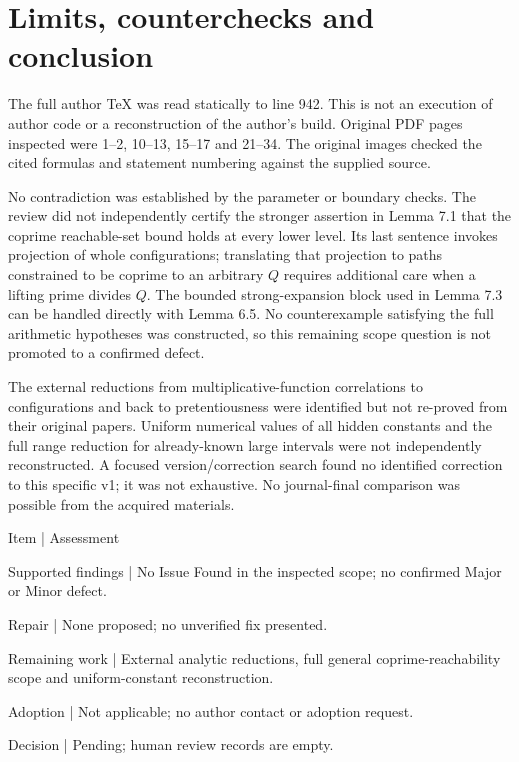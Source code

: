 \documentclass[10pt]{article}
\begin{document}
\section*{Limits, counterchecks and conclusion}
The full author TeX was read statically to line 942. This is not an execution of author code or a reconstruction of the author’s build. Original PDF pages inspected were 1–2, 10–13, 15–17 and 21–34. The original images checked the cited formulas and statement numbering against the supplied source.\par
No contradiction was established by the parameter or boundary checks. The review did not independently certify the stronger assertion in Lemma 7.1 that the coprime reachable-set bound holds at every lower level. Its last sentence invokes projection of whole configurations; translating that projection to paths constrained to be coprime to an arbitrary \(Q\) requires additional care when a lifting prime divides \(Q\). The bounded strong-expansion block used in Lemma 7.3 can be handled directly with Lemma 6.5. No counterexample satisfying the full arithmetic hypotheses was constructed, so this remaining scope question is not promoted to a confirmed defect.\par
The external reductions from multiplicative-function correlations to configurations and back to pretentiousness were identified but not re-proved from their original papers. Uniform numerical values of all hidden constants and the full range reduction for already-known large intervals were not independently reconstructed. A focused version/correction search found no identified correction to this specific v1; it was not exhaustive. No journal-final comparison was possible from the acquired materials.\par
Item | Assessment\par
Supported findings | No Issue Found in the inspected scope; no confirmed Major or Minor defect.\par
Repair | None proposed; no unverified fix presented.\par
Remaining work | External analytic reductions, full general coprime-reachability scope and uniform-constant reconstruction.\par
Adoption | Not applicable; no author contact or adoption request.\par
Decision | Pending; human review records are empty.\par
\end{document}
